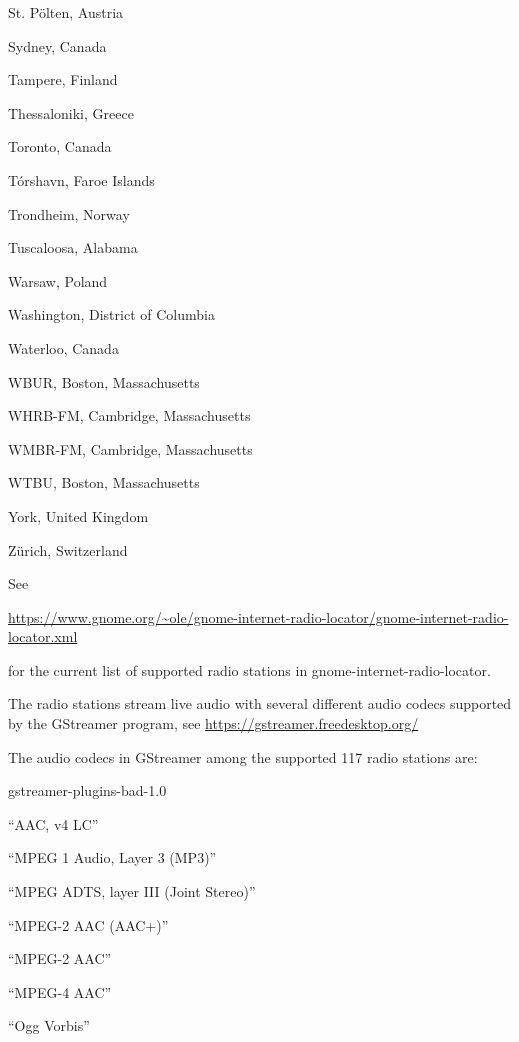 \documentclass[20pt,landscape]{foils}
\begin{document}
\begin{list1}
\begin{list2}
  \item St. Pölten, Austria
  \item Sydney, Canada
  \item Tampere, Finland
  \item Thessaloniki, Greece
  \item Toronto, Canada
  \item Tórshavn, Faroe Islands
  \item Trondheim, Norway
  \item Tuscaloosa, Alabama
  \item Warsaw, Poland
  \item Washington, District of Columbia
  \item Waterloo, Canada
  \item WBUR, Boston, Massachusetts
  \item WHRB-FM, Cambridge, Massachusetts
  \item WMBR-FM, Cambridge, Massachusetts
  \item WTBU, Boston, Massachusetts
  \item York, United Kingdom
  \item Zürich, Switzerland
  \end{list2}
\end{list1}

See
\begin{tiny}\url{https://www.gnome.org/~ole/gnome-internet-radio-locator/gnome-internet-radio-locator.xml}\end{tiny} for the current list of supported radio stations in gnome-internet-radio-locator.


The radio stations stream live audio with several different audio codecs supported by the GStreamer program, see \url{https://gstreamer.freedesktop.org/}

The audio codecs in GStreamer among the supported 117 radio stations are:

\begin{list1}
  \item gstreamer-plugins-bad-1.0
    \begin{list2}
    \item ``AAC, v4 LC''
    \item ``MPEG 1 Audio, Layer 3 (MP3)''
    \item ``MPEG ADTS, layer III (Joint Stereo)''
    \item ``MPEG-2 AAC (AAC+)''
    \item ``MPEG-2 AAC''
    \item ``MPEG-4 AAC''
    \item ``Ogg Vorbis''
    \end{list2}
\end{list1}
\end{document}
